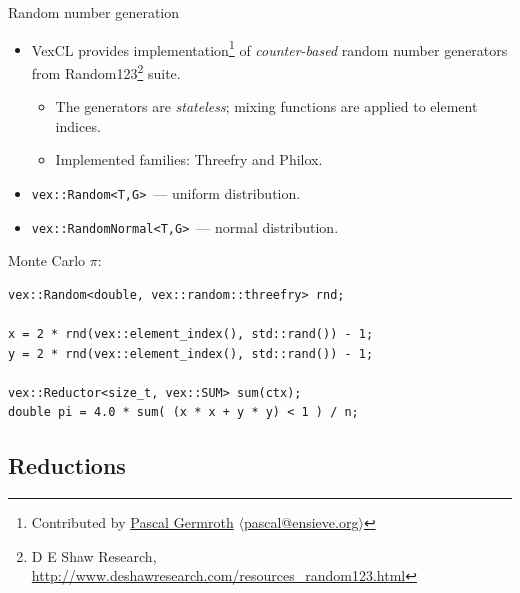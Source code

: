 \documentclass[@BEAMER_OPTIONS@]{beamer}
\newcommand{\code}[1]{\lstinline|#1|}
\begin{document}
\begin{frame}[fragile]{Random number generation}
    \begin{itemize}
        \item VexCL provides implementation\footnote{Contributed by
            \href{https://github.com/neapel}{Pascal Germroth}
            $\langle$\href{mailto:pascal@ensieve.org}{pascal@ensieve.org}$\rangle$}
            of \emph{counter-based} random number generators from
            Random123\footnote{D E Shaw Research,
                \href{http://www.deshawresearch.com/resources\_random123.html}{http://www.deshawresearch.com/resources\_random123.html}}
            suite.
            \begin{itemize}
                \item The generators are \emph{stateless}; mixing functions are
                    applied to element indices.
                \item Implemented families: Threefry and Philox.
            \end{itemize}
        \item \code{vex::Random<T,G>}~--- uniform distribution.
        \item \code{vex::RandomNormal<T,G>}~--- normal distribution.
    \end{itemize}
    \begin{exampleblock}{Monte Carlo $\pi$:}
        \begin{lstlisting}
vex::Random<double, vex::random::threefry> rnd;

x = 2 * rnd(vex::element_index(), std::rand()) - 1;
y = 2 * rnd(vex::element_index(), std::rand()) - 1;

vex::Reductor<size_t, vex::SUM> sum(ctx);
double pi = 4.0 * sum( (x * x + y * y) < 1 ) / n;
        \end{lstlisting}
    \end{exampleblock}
\end{frame}


\subsection{Reductions}
\end{document}
